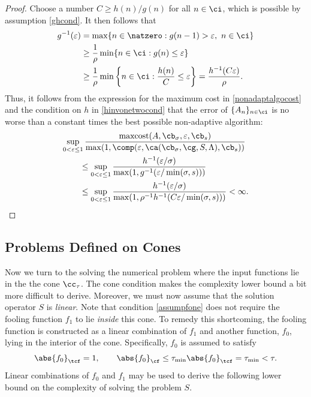 \documentclass[]{elsarticle}
\DeclareMathOperator{\maxcost}{maxcost}
\theoremstyle{definition}
\theoremstyle{remark}
\newcommand{\Fnorm}[1]{\abs{#1}_{\cf}}
\newcommand{\Ftnorm}[1]{\abs{#1}_{\tcf}}
\begin{document}
\begin{proof}  Choose a number $C \ge h(n)/g(n)$ for all $n \in \ci$, which is possible by assumption \eqref{ghcond}.  It then follows that
\begin{align*}
g^{-1}(\varepsilon) &= \max \{ n \in \natzero : g(n-1) > \varepsilon, \ n \in \ci \} \\ 
& \ge \frac{1}{\rho}\min\{ n \in \ci : g(n) \le \varepsilon\}  \\
& \ge \frac{1}{\rho} \min \left \{ n \in \ci : \frac{h(n)}{C} \le \varepsilon \right\} = \frac{h^{-1}(C \varepsilon)}{\rho}.
\end{align*}
Thus, it follows from the expression for the maximum cost in \eqref{nonadaptalgocost} and the condition on $h$ in \eqref{hinvonetwocond} that the error of $\{A_n\}_{n \in \ci}$ is no worse than a constant times the best possible non-adaptive algorithm:
\begin{align*}
\MoveEqLeft{\sup_{0 < \varepsilon \le 1} \frac{\maxcost(A,\cb_{\sigma},\varepsilon,\cb_{s})}
{\max(1,\comp(\varepsilon,\ca(\cb_{\sigma},\cg,S,\Lambda),\cb_s))}} \\
& \le \sup_{0 < \varepsilon \le 1} \frac{h^{-1}(\varepsilon/\sigma)} {\max(1,g^{-1}(\varepsilon/\min(\sigma,s)))} \\
& \le \sup_{0 < \varepsilon \le 1} \frac{h^{-1}(\varepsilon/\sigma)} {\max(1,\rho^{-1} h^{-1}(C\varepsilon/\min(\sigma,s)))} <\infty.
\end{align*}
\end{proof}

\subsection{Problems Defined on Cones} \label{coneoptsubsec}

Now we turn to the solving the numerical problem where the input functions lie in the the cone $\cc_{\tau}$.  The cone condition makes the complexity lower bound a bit more difficult to derive.  Moreover, we must now assume that the solution operator $S$ is \emph{linear}.  Note that condition \eqref{assumpfone} does not require the fooling function $f_1$ to lie \emph{inside} this cone.  To remedy this shortcoming, the fooling function is constructed as a linear combination of $f_1$ and another function, $f_0$, lying in the interior of the cone.
Specifically, $f_0$ is assumed to satisfy
\begin{equation}
\label{assumpfzero}
\Ftnorm{f_{0}} = 1, \qquad \Fnorm{f_{0}} \le \tau_{\min} \Ftnorm{f_{0}} = \tau_{\min} < \tau.
\end{equation}
Linear combinations of $f_0$ and $f_1$ may be used to derive the following lower bound on the complexity of solving the problem $S$.
\end{document}
